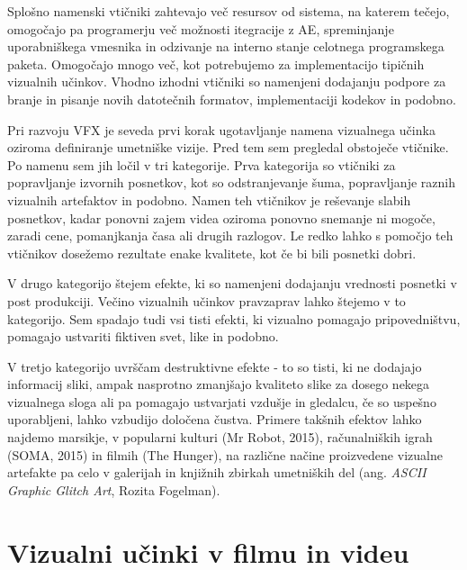 \documentclass[a4paper, 12pt]{book}
\begin{document}
Splošno namenski vtičniki zahtevajo več resursov od sistema, na katerem tečejo, omogočajo pa programerju več možnosti itegracije z AE, spreminjanje uporabniškega vmesnika in odzivanje na interno stanje celotnega programskega paketa. 
Omogočajo mnogo več, kot potrebujemo za implementacijo tipičnih vizualnih učinkov. 
Vhodno izhodni vtičniki so namenjeni dodajanju podpore za branje in pisanje novih datotečnih formatov, implementaciji kodekov in podobno.

Pri razvoju VFX je seveda prvi korak ugotavljanje namena vizualnega učinka oziroma definiranje umetniške vizije. 
Pred tem sem pregledal obstoječe vtičnike. 
Po namenu sem jih ločil v tri kategorije. 
Prva kategorija so vtičniki za popravljanje izvornih posnetkov, kot so odstranjevanje šuma, popravljanje raznih vizualnih artefaktov in podobno. 
Namen teh vtičnikov je reševanje slabih posnetkov, kadar ponovni zajem videa oziroma ponovno snemanje ni mogoče, zaradi cene, pomanjkanja časa ali drugih razlogov. 
Le redko lahko s pomočjo teh vtičnikov dosežemo rezultate enake kvalitete, kot če bi bili posnetki dobri. 

V drugo kategorijo štejem efekte, ki so namenjeni dodajanju vrednosti posnetki v post produkciji. 
Večino vizualnih učinkov pravzaprav lahko štejemo v to kategorijo. 
Sem spadajo tudi vsi tisti efekti, ki vizualno pomagajo pripovedništvu, pomagajo ustvariti fiktiven svet, like in podobno. 

V tretjo kategorijo uvrščam destruktivne efekte - to so tisti, ki ne dodajajo informacij sliki, ampak nasprotno zmanjšajo kvaliteto slike za dosego nekega vizualnega sloga ali pa pomagajo ustvarjati vzdušje in gledalcu, če so uspešno uporabljeni, lahko vzbudijo določena čustva. 
Primere takšnih efektov lahko najdemo marsikje, v popularni kulturi (Mr Robot, 2015), %
računalniških igrah (SOMA, 2015) %
 in filmih (The Hunger), %
na različne načine proizvedene vizualne artefakte pa celo v galerijah in knjižnih zbirkah umetniških del (ang. {\it ASCII Graphic Glitch Art}, Rozita Fogelman).



\chapter{Vizualni učinki v filmu in videu}
\end{document}
